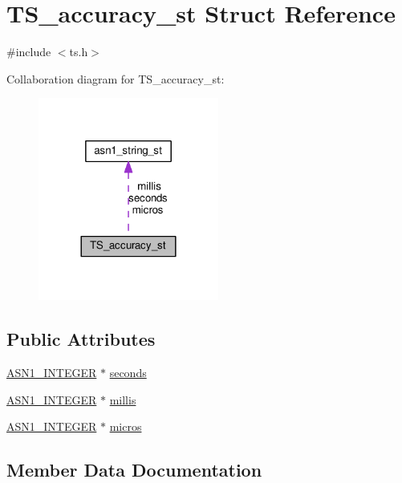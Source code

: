 \hypertarget{struct_t_s__accuracy__st}{}\section{T\+S\+\_\+accuracy\+\_\+st Struct Reference}
\label{struct_t_s__accuracy__st}


{\ttfamily \#include $<$ts.\+h$>$}



Collaboration diagram for T\+S\+\_\+accuracy\+\_\+st\+:
\nopagebreak
\begin{figure}[H]
\begin{center}
\leavevmode
\includegraphics[width=168pt]{struct_t_s__accuracy__st__coll__graph}
\end{center}
\end{figure}
\subsection*{Public Attributes}
\begin{DoxyCompactItemize}
\item 
\hyperlink{ossl__typ_8h_af4335399bf9774cb410a5e93de65998b}{A\+S\+N1\+\_\+\+I\+N\+T\+E\+G\+ER} $\ast$ \hyperlink{struct_t_s__accuracy__st_a50d21da03ece4bf6c78f3fa96ffaae15}{seconds}
\item 
\hyperlink{ossl__typ_8h_af4335399bf9774cb410a5e93de65998b}{A\+S\+N1\+\_\+\+I\+N\+T\+E\+G\+ER} $\ast$ \hyperlink{struct_t_s__accuracy__st_a617d05085e9ab508437929ab86b6f4a3}{millis}
\item 
\hyperlink{ossl__typ_8h_af4335399bf9774cb410a5e93de65998b}{A\+S\+N1\+\_\+\+I\+N\+T\+E\+G\+ER} $\ast$ \hyperlink{struct_t_s__accuracy__st_af1acda98f117fef39f799581bf37bb38}{micros}
\end{DoxyCompactItemize}


\subsection{Member Data Documentation}
